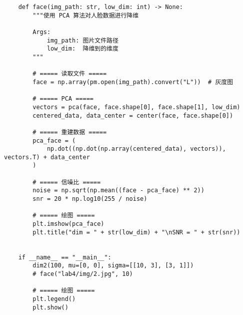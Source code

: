 \begin{verbatim}
    def face(img_path: str, low_dim: int) -> None:
        """使用 PCA 算法对人脸数据进行降维

        Args:
            img_path: 图片文件路径
            low_dim:  降维到的维度
        """

        # ===== 读取文件 =====
        face = np.array(pm.open(img_path).convert("L"))  # 灰度图

        # ===== PCA =====
        vectors = pca(face, face.shape[0], face.shape[1], low_dim)
        centered_data, data_center = center(face, face.shape[0])

        # ===== 重建数据 =====
        pca_face = (
            np.dot((np.dot(np.array(centered_data), vectors)), vectors.T) + data_center
        )

        # ===== 信噪比 =====
        noise = np.sqrt(np.mean((face - pca_face) ** 2))
        snr = 20 * np.log10(255 / noise)

        # ===== 绘图 =====
        plt.imshow(pca_face)
        plt.title("dim = " + str(low_dim) + "\nSNR = " + str(snr))


    if __name__ == "__main__":
        dim2(100, mu=[0, 0], sigma=[[10, 3], [3, 1]])
        # face("lab4/img/2.jpg", 10)

        # ===== 绘图 =====
        plt.legend()
        plt.show()
\end{verbatim}
